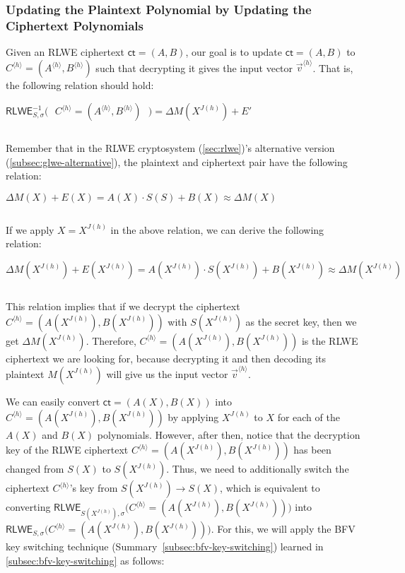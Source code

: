 \subsubsection{Updating the Plaintext Polynomial by Updating the Ciphertext Polynomials}

Given an RLWE ciphertext $\textsf{ct} = (A, B)$, our goal is to update $\textsf{ct} = (A, B)$ to $C^{\langle h \rangle} = (A^{\langle h \rangle}, B^{\langle h \rangle})$ such that decrypting it gives the input vector $\vec{v}^{\langle h \rangle}$. That is, the following relation should hold: 

$\textsf{RLWE}^{-1}_{S, \sigma}\bm{(} \text{ } C^{\langle h \rangle} = (A^{\langle h \rangle}, B^{\langle h \rangle}) \text{ }\bm{)} = \Delta M(X^{J(h)}) + E'$

$ $

Remember that in the RLWE cryptosystem (\autoref{sec:rlwe})'s alternative version (\autoref{subsec:glwe-alternative}), the plaintext and ciphertext pair have the following relation:

$\Delta M(X) + E(X) = A(X)\cdot S(S) + B(X) \approx \Delta M(X)$

$ $

If we apply $X = X^{J(h)}$ in the above relation, we can derive the following relation: 

$\Delta M(X^{J(h)}) + E(X^{J(h)}) = A(X^{J(h)}) \cdot S(X^{J(h)}) + B(X^{J(h)}) \approx \Delta M(X^{J(h)})$

$ $

This relation implies that if we decrypt the ciphertext $C^{\langle h \rangle} = (A(X^{J(h)}), B(X^{J(h)}))$ with $S(X^{J(h)})$ as the secret key, then we get $\Delta M(X^{J(h)})$. Therefore, $C^{\langle h \rangle} = (A(X^{J(h)}), B(X^{J(h)}))$ is the RLWE ciphertext we are looking for, because decrypting it and then decoding its plaintext $M(X^{J(h)})$ will give us the input vector $\vec{v}^{\langle h \rangle}$. 

We can easily convert $\textsf{ct} = (A(X), B(X))$ into $C^{\langle h \rangle} = (A(X^{J(h)}), B(X^{J(h)}))$ by applying $X^{J(h)}$ to $X$ for each of the $A(X)$ and $B(X)$ polynomials. However, after then, notice that the decryption key of the RLWE ciphertext $C^{\langle h \rangle} = (A(X^{J(h)}), B(X^{J(h)}))$ has been changed from $S(X)$ to $S(X^{J(h)})$. Thus, we need to additionally switch the ciphertext $C^{\langle h \rangle}$'s key from $S(X^{J(h)}) \rightarrow S(X)$, which is equivalent to converting $\textsf{RLWE}_{S(X^{J(h)}), \sigma}\bm{(} C^{\langle h \rangle} = (A(X^{J(h)}), B(X^{J(h)})) \bm{)}$ into $\textsf{RLWE}_{S, \sigma}\bm{(} C^{\langle h \rangle} = (A(X^{J(h)}), B(X^{J(h)})) \bm{)}$. For this, we will apply the BFV key switching technique (Summary~\ref*{subsec:bfv-key-switching}) learned in \autoref{subsec:bfv-key-switching} as follows: 

